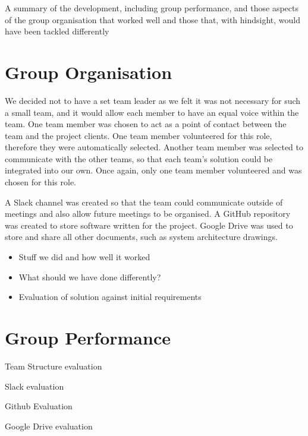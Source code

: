 A summary of the development, including group performance, and those aspects of the group organisation that worked well and those that, with hindsight, would have been tackled differently

\section{Group Organisation}
We decided not to have a set team leader as we felt it was not necessary for such a small team, and it would allow each member to have an equal voice within the team.  One team member was chosen to act as a point of contact between the team and the project clients. One team member volunteered for this role, therefore they were automatically selected. Another team member was selected to communicate with the other teams, so that each team's solution could be integrated into our own. Once again, only one team member volunteered and was chosen for this role.

A Slack \cite{slack} channel was created so that the team could communicate outside of meetings and also allow future meetings to be organised. A GitHub \cite{github} repository was created to store software written for the project. Google Drive \cite{googledrive} was used to store and share all other documents, such as system architecture drawings.


\begin{itemize}
    \item Stuff we did and how well it worked
    \item What should we have done differently?
    \item Evaluation of solution against initial requirements
\end{itemize}

\section{Group Performance}
Team Structure evaluation

Slack evaluation

Github Evaluation

Google Drive evaluation